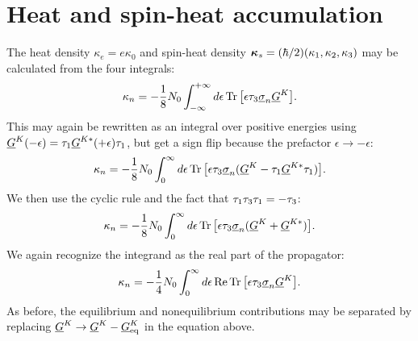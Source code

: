 \section{Heat and spin-heat accumulation}
The heat density $\kappa_{e} = e\kappa_0$ and spin-heat density $\bm{\kappa}_{s} = (\hbar/2)(\kappa_1, \kappa_2, \kappa_3)$ may be calculated from the four integrals:
\begin{equation}
  \kappa_n = -\frac{1}{8}N_0 \int_{-\infty}^{+\infty} d\epsilon \operatorname{Tr}\big[ \epsilon\tau_{3}\underline{\sigma}_{n} \underline{G}^K \big].
\end{equation}
This may again be rewritten as an integral over positive energies using $\underline{G}^K(-\epsilon) = \tau_{1} \underline{G}^{K*}(+\epsilon) \tau_{1}$, but get a sign flip because the prefactor $\epsilon \rightarrow -\epsilon$:
\begin{equation}
  \kappa_n = -\frac{1}{8}N_0 \int_{0}^{\infty} d\epsilon \operatorname{Tr}\big[ \epsilon\tau_{3}\underline{\sigma}_{n} (\underline{G}^K - \tau_{1} \underline{G}^{K*} \tau_{1}) \big].
\end{equation}
We then use the cyclic rule and the fact that $\tau_{1}\tau_{3}\tau_{1} = -\tau_{3}$:
\begin{equation}
  \kappa_n = -\frac{1}{8}N_0 \int_{0}^{\infty} d\epsilon \operatorname{Tr}\big[ \epsilon\tau_{3}\underline{\sigma}_{n} (\underline{G}^K + \underline{G}^{K*}) \big].
\end{equation}
We again recognize the integrand as the real part of the propagator:
\begin{equation}
  \kappa_n = -\frac{1}{4}N_0 \int_{0}^{\infty} d\epsilon \operatorname{Re}\operatorname{Tr}\big[ \epsilon\tau_{3}\underline{\sigma}_{n} \underline{G}^K \big].
\end{equation}
As before, the equilibrium and nonequilibrium contributions may be separated by replacing $\underline{G}^K \rightarrow \underline{G}^K - \underline{G}^K_\text{eq}$ in the equation above.



\clearpage
